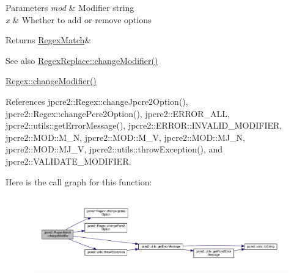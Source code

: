 \begin{DoxyParams}{Parameters}
{\em mod} & Modifier string \\
\hline
{\em x} & Whether to add or remove options \\
\hline
\end{DoxyParams}
\begin{DoxyReturn}{Returns}
\hyperlink{classjpcre2_1_1RegexMatch}{Regex\+Match}\& 
\end{DoxyReturn}
\begin{DoxySeeAlso}{See also}
\hyperlink{classjpcre2_1_1RegexReplace_a0a2dc39fc28e6f7fe0a5d638f5891bdb}{Regex\+Replace\+::change\+Modifier()} 

\hyperlink{classjpcre2_1_1Regex_a9ab3efed9819a51225456e6d8487de56}{Regex\+::change\+Modifier()} 
\end{DoxySeeAlso}


References jpcre2\+::\+Regex\+::change\+Jpcre2\+Option(), jpcre2\+::\+Regex\+::change\+Pcre2\+Option(), jpcre2\+::\+E\+R\+R\+O\+R\+\_\+\+A\+LL, jpcre2\+::utils\+::get\+Error\+Message(), jpcre2\+::\+E\+R\+R\+O\+R\+::\+I\+N\+V\+A\+L\+I\+D\+\_\+\+M\+O\+D\+I\+F\+I\+ER, jpcre2\+::\+M\+O\+D\+::\+M\+\_\+N, jpcre2\+::\+M\+O\+D\+::\+M\+\_\+V, jpcre2\+::\+M\+O\+D\+::\+M\+J\+\_\+N, jpcre2\+::\+M\+O\+D\+::\+M\+J\+\_\+V, jpcre2\+::utils\+::throw\+Exception(), and jpcre2\+::\+V\+A\+L\+I\+D\+A\+T\+E\+\_\+\+M\+O\+D\+I\+F\+I\+ER.



Here is the call graph for this function\+:\nopagebreak
\begin{figure}[H]
\begin{center}
\leavevmode
\includegraphics[width=350pt]{classjpcre2_1_1RegexMatch_a877be3123d789020d259939bc79e8cfe_cgraph}
\end{center}
\end{figure}


